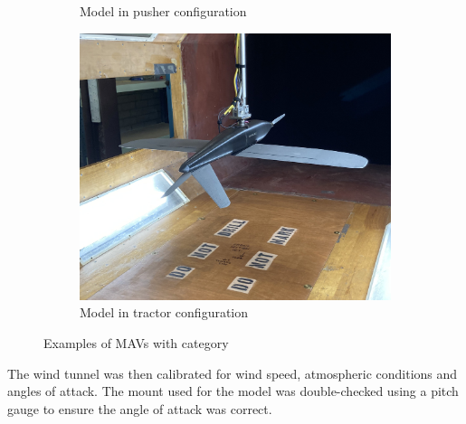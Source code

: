 \begin{figure}[H]
\begin{subfigure}[b]{0.3\textwidth}
             \caption{Model in pusher configuration}
             \label{fig:pusher}
     \end{subfigure}
     \hfill
     \begin{subfigure}[b]{0.3\textwidth}
             \centering
             \includegraphics[scale=0.05]{04_Methodology/Figs/tractors}
             \caption{Model in tractor configuration}
             \label{fig:tractors}
     \end{subfigure}
        \caption{Examples of MAVs with category}
        \label{fig:typesUsed}
\end{figure}


The wind tunnel was then calibrated for wind speed, atmospheric conditions and angles of attack. The mount used for the model was double-checked using a pitch gauge to ensure the angle of attack was correct. 


